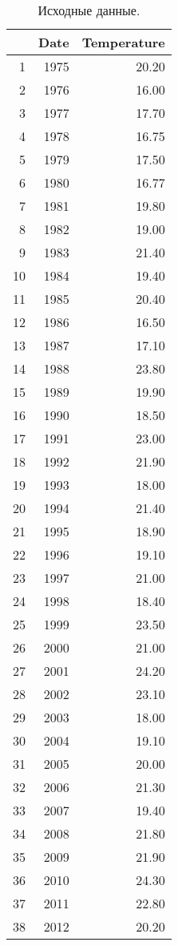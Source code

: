 \begin{table}[H]
\centering
\begin{tabular}{rrr}
  \hline
 & Date & Temperature \\ 
  \hline
1 & 1975 & 20.20 \\ 
  2 & 1976 & 16.00 \\ 
  3 & 1977 & 17.70 \\ 
  4 & 1978 & 16.75 \\ 
  5 & 1979 & 17.50 \\ 
  6 & 1980 & 16.77 \\ 
  7 & 1981 & 19.80 \\ 
  8 & 1982 & 19.00 \\ 
  9 & 1983 & 21.40 \\ 
  10 & 1984 & 19.40 \\ 
  11 & 1985 & 20.40 \\ 
  12 & 1986 & 16.50 \\ 
  13 & 1987 & 17.10 \\ 
  14 & 1988 & 23.80 \\ 
  15 & 1989 & 19.90 \\ 
  16 & 1990 & 18.50 \\ 
  17 & 1991 & 23.00 \\ 
  18 & 1992 & 21.90 \\ 
  19 & 1993 & 18.00 \\ 
  20 & 1994 & 21.40 \\ 
  21 & 1995 & 18.90 \\ 
  22 & 1996 & 19.10 \\ 
  23 & 1997 & 21.00 \\ 
  24 & 1998 & 18.40 \\ 
  25 & 1999 & 23.50 \\ 
  26 & 2000 & 21.00 \\ 
  27 & 2001 & 24.20 \\ 
  28 & 2002 & 23.10 \\ 
  29 & 2003 & 18.00 \\ 
  30 & 2004 & 19.10 \\ 
  31 & 2005 & 20.00 \\ 
  32 & 2006 & 21.30 \\ 
  33 & 2007 & 19.40 \\ 
  34 & 2008 & 21.80 \\ 
  35 & 2009 & 21.90 \\ 
  36 & 2010 & 24.30 \\ 
  37 & 2011 & 22.80 \\ 
  38 & 2012 & 20.20 \\ 
   \hline
\end{tabular}
\caption{Исходные данные.} 
\label{table:source}
\end{table}
